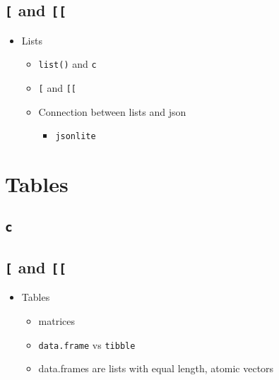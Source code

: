 \documentclass[
]{book}
\providecommand{\tightlist}{%
  \setlength{\itemsep}{0pt}\setlength{\parskip}{0pt}}
\begin{document}
\hypertarget{and-1}{%
\section{\texorpdfstring{\texttt{{[}} and \texttt{{[}{[}}}{{[} and {[}{[}}}\label{and-1}}

\begin{itemize}
\tightlist
\item
  Lists

  \begin{itemize}
  \tightlist
  \item
    \texttt{list()} and \texttt{c}
  \item
    \texttt{{[}} and \texttt{{[}{[}}
  \item
    Connection between lists and json

    \begin{itemize}
    \tightlist
    \item
      \texttt{jsonlite}
    \end{itemize}
  \end{itemize}
\end{itemize}

\hypertarget{tables}{%
\chapter{Tables}\label{tables}}

\hypertarget{c-1}{%
\section{\texorpdfstring{\texttt{c}}{c}}\label{c-1}}

\hypertarget{and-2}{%
\section{\texorpdfstring{\texttt{{[}} and \texttt{{[}{[}}}{{[} and {[}{[}}}\label{and-2}}

\begin{itemize}
\tightlist
\item
  Tables

  \begin{itemize}
  \tightlist
  \item
    matrices
  \item
    \texttt{data.frame} vs \texttt{tibble}
  \item
    data.frames are lists with equal length, atomic vectors
  \end{itemize}
\end{itemize}
\end{document}
